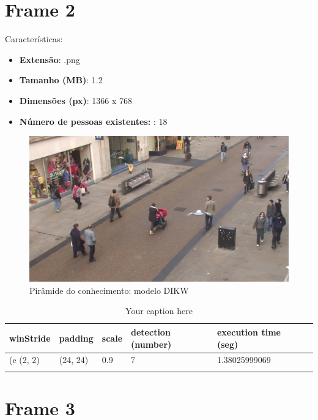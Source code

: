 \newpage
\section{Frame 2}

Características: 
\begin{itemize}
	\item \textbf{Extensão}: .png
	\item \textbf{Tamanho (MB)}: 1.2
	\item \textbf{Dimensões (px)}: 1366 x 768
	\item \textbf{Número de pessoas existentes: } : 18
\end{itemize}


\begin{figure}[!htb]
	\centering
	\includegraphics[width=\linewidth]{img/vision/frame2.png}
	\caption{Pirâmide do conhecimento: modelo DIKW}
	\label{db}
\end{figure}



\begin{longtable}{|l|l|l|l|l|l|} 
\hline
\textbf{winStride} & \textbf{padding} & \textbf{scale} & \textbf{detection (number)} & \textbf{execution time (seg)} \\ \hline
(e
(2, 2) & (24, 24) & 0.9 & 7 & 1.38025999069 \\ \hline

	\caption{Your caption here} %
	\label{tab:myfirstlongtable}
\end{longtable}





\newpage
\section{Frame 3}


